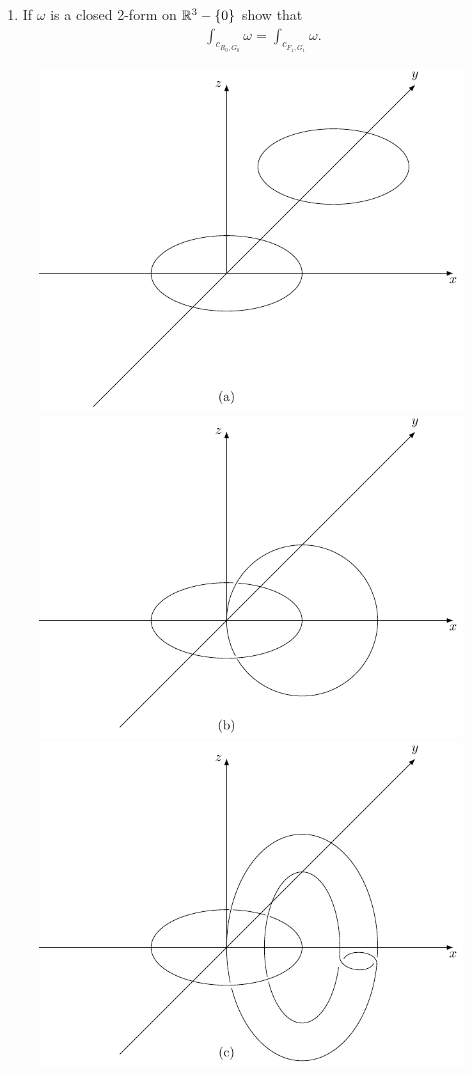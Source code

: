 \begin{problems}
{\begin{enumerate}[label=(\alph*)]
                If $(F,G)$ is a homotopy of nonintersecting closed curves define 
                $C_{F,G}:[0,1]^3\to\F{R}^3-\{0\}$ by 
                \begin{align*}
                    C_{F,G}(s,u,v)=c_{F_s,G_s}(u,v)=F(s,u)-G(s,v).
                \end{align*}

                Show that 
                \begin{align*}
                    \partial C_{F,G}=c_{F_0,G_0}-c_{F_1,G_1}.
                \end{align*}
            \item If $\omega$ is a closed 2-form on $\mathbb{R}^3-\{0\}$ show that 
                \begin{align*}
                  \int_{c_{R_0,G_0}}\omega = \int_{c_{F_1,G_1}}\omega.
                \end{align*}
        \end{enumerate}
    }
\end{problems}
\begin{figure}[!htb]
    \centering
    \includegraphics[width=.65\linewidth]{./pics/Fig4-6-(a).pdf}
    
    \includegraphics[width=.65\linewidth]{./pics/Fig4-6-(b).pdf}
    
    \includegraphics[width=.65\linewidth]{./pics/Fig4-6-(c).pdf}
    \caption{}
    \label{Fig 4-6}
\end{figure}